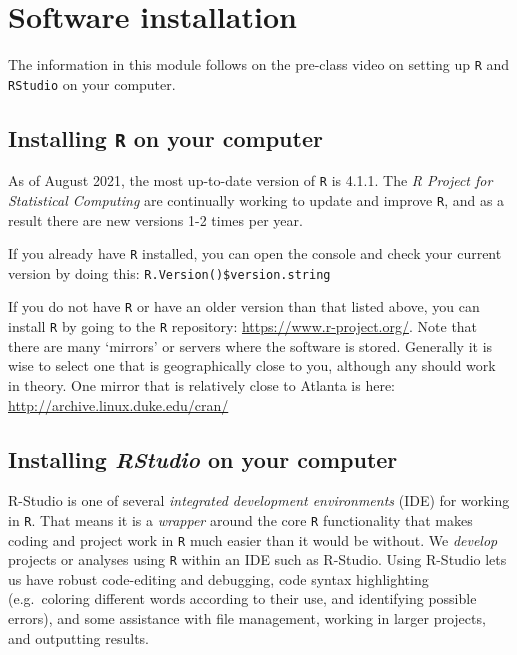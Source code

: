 \documentclass[
]{book}
\begin{document}
\hypertarget{software-installation}{%
\chapter*{Software installation}\label{software-installation}}

The information in this module follows on the pre-class video on setting up \texttt{R} and \texttt{RStudio} on your computer.

\hypertarget{installing-r-on-your-computer}{%
\section*{\texorpdfstring{Installing \texttt{R} on your computer}{Installing R on your computer}}\label{installing-r-on-your-computer}}

As of August 2021, the most up-to-date version of \texttt{R} is 4.1.1. The \emph{R Project for Statistical Computing} are continually working to update and improve \texttt{R}, and as a result there are new versions 1-2 times per year.

If you already have \texttt{R} installed, you can open the console and check your current version by doing this: \texttt{R.Version()\$version.string}

If you do not have \texttt{R} or have an older version than that listed above, you can install \texttt{R} by going to the \texttt{R} repository: \url{https://www.r-project.org/}. Note that there are many `mirrors' or servers where the software is stored. Generally it is wise to select one that is geographically close to you, although any should work in theory. One mirror that is relatively close to Atlanta is here: \url{http://archive.linux.duke.edu/cran/}

\hypertarget{installing-rstudio-on-your-computer}{%
\section*{\texorpdfstring{Installing \emph{RStudio} on your computer}{Installing RStudio on your computer}}\label{installing-rstudio-on-your-computer}}

R-Studio is one of several \emph{integrated development environments} (IDE) for working in \texttt{R}. That means it is a \emph{wrapper} around the core \texttt{R} functionality that makes coding and project work in \texttt{R} much easier than it would be without. We \emph{develop} projects or analyses using \texttt{R} within an IDE such as R-Studio. Using R-Studio lets us have robust code-editing and debugging, code syntax highlighting (e.g.~coloring different words according to their use, and identifying possible errors), and some assistance with file management, working in larger projects, and outputting results.
\end{document}
